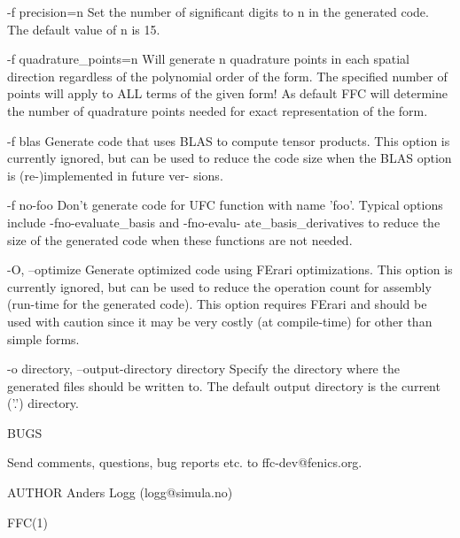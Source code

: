        -f precision=n
              Set the number of significant digits to n in the generated code.
              The default value of n is 15.

       -f quadrature_points=n
              Will  generate  n quadrature  points  in  each spatial direction
              regardless of the  polynomial order of the  form. The  specified
              number  of points  will apply to ALL terms of the given form! As
              default  FFC  will  determine  the  number of quadrature  points
              needed for exact representation of the form.

       -f blas
              Generate code that uses BLAS to compute tensor  products.   This
              option  is currently ignored, but can be used to reduce the code
              size when the BLAS option is  (re-)implemented  in  future  ver-
              sions.

       -f no-foo
              Don't  generate  code  for UFC function with name 'foo'. Typical
              options    include    -fno-evaluate_basis    and     -fno-evalu-
              ate_basis_derivatives  to  reduce the size of the generated code
              when these functions are not needed.

       -O, --optimize
              Generate optimized code using FErari optimizations. This  option
              is  currently  ignored,  but can be used to reduce the operation
              count for assembly  (run-time  for  the  generated  code).  This
              option  requires FErari and should be used with caution since it
              may be very costly  (at  compile-time)  for  other  than  simple
              forms.

       -o directory, --output-directory directory
              Specify the directory where the generated files should be written
              to. The default output directory is the current ('.') directory.

       BUGS

       Send comments, questions, bug reports etc. to ffc-dev@fenics.org.

AUTHOR
       Anders Logg (logg@simula.no)

                                                                        FFC(1)
